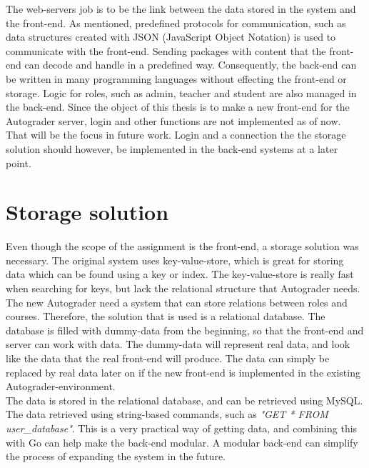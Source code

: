 The web-servers job is to be the link between the data stored in the system and the front-end. As mentioned, predefined protocols for communication, such as data structures created with JSON (JavaScript Object Notation) is used to communicate with the front-end. Sending packages with content that the front-end can decode and handle in a predefined way. Consequently, the back-end can be written in many programming languages without effecting the front-end or storage. Logic for roles, such as admin, teacher and student are also managed in the back-end. Since the object of this thesis is to make a new front-end for the Autograder server, login and other functions are not implemented as of now. That will be the focus in future work. Login and a connection the the storage solution should however, be implemented in the back-end systems at a later point. 

\section{Storage solution}
Even though the scope of the assignment is the front-end, a storage solution was necessary. The original system uses key-value-store, which is great for storing data which can be found using a key or index. The key-value-store is really fast when searching for keys, but lack the relational structure that Autograder needs. The new Autograder need a system that can store relations between roles and courses. Therefore, the solution that is used is a relational database. The database is filled with dummy-data from the beginning, so that the front-end and server can work with data. The dummy-data will represent real data, and look like the data that the real front-end will produce. The data can simply be replaced by real data later on if the new front-end is implemented in the existing Autograder-environment. \\The data is stored in the relational database, and can be retrieved using MySQL. The data retrieved using string-based commands, such as \emph{"GET * FROM user\_database"}. This is a very practical way of getting data, and combining this with Go can help make the back-end modular. A modular back-end can simplify the process of expanding the system in the future.